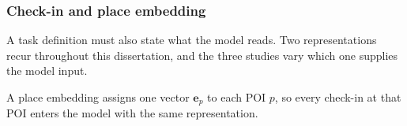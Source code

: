 \subsubsection{Check-in and place embedding}

A task definition must also state what the model reads. Two representations recur
throughout this dissertation, and the three studies vary which one supplies the model
input.

\begin{definition}\label{def:fund:placelevel}
    A place embedding assigns one vector $\mathbf{e}_p$ to each POI $p$, so every check-in
    at that POI enters the model with the same representation.
\end{definition}

